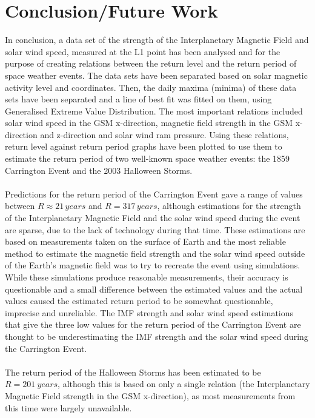 \documentclass[12pt]{article}
\begin{document}
\section{Conclusion/Future Work}\label{sec:conclusions}
    In conclusion, a data set of the strength of the Interplanetary Magnetic Field and solar wind speed, measured at the L1 point has been analysed and for the purpose of creating relations between the return level and the return period of space weather events. The data sets have been separated based on solar magnetic activity level and coordinates. Then, the daily maxima (minima) of these data sets have been separated and a line of best fit was fitted on them, using Generalised Extreme Value Distribution. The most important relations included solar wind speed in the GSM x-direction, magnetic field strength in the GSM x-direction and z-direction and solar wind ram pressure. Using these relations, return level against return period graphs have been plotted to use them to estimate the return period of two well-known space weather events: the 1859 Carrington Event and the 2003 Halloween Storms.\\ \\
    Predictions for the return period of the Carrington Event gave a range of values between $R\approx 21\, years$ and $R=317\, years$, although estimations for the strength of the Interplanetary Magnetic Field and the solar wind speed during the event are sparse, due to the lack of technology during that time. These estimations are based on measurements taken on the surface of Earth and the most reliable method to estimate the magnetic field strength and the solar wind speed outside of the Earth's magnetic field was to try to recreate the event using simulations. While these simulations produce reasonable measurements, their accuracy is questionable and a small difference between the estimated values and the actual values caused the estimated return period to be somewhat questionable, imprecise and unreliable. The IMF strength and solar wind speed estimations that give the three low values for the return period of the Carrington Event are thought to be underestimating the IMF strength and the solar wind speed during the Carrington Event.\\ \\
    The return period of the Halloween Storms has been estimated to be $R=201\ years$, although this is based on only a single relation (the Interplanetary Magnetic Field strength in the GSM x-direction), as most measurements from this time were largely unavailable.\\ \\
\end{document}
